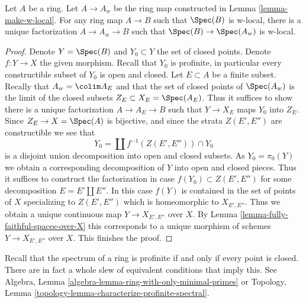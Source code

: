 \begin{lemma}
\label{lemma-universal}
Let $A$ be a ring. Let $A \to A_w$ be the ring map constructed in
Lemma \ref{lemma-make-w-local}. For any ring map $A \to B$ such that
$\Spec(B)$ is w-local, there is a unique factorization $A \to A_w \to B$
such that $\Spec(B) \to \Spec(A_w)$ is w-local.
\end{lemma}

\begin{proof}
Denote $Y = \Spec(B)$ and $Y_0 \subset Y$ the set of closed points.
Denote $f : Y \to X$ the given morphism.
Recall that $Y_0$ is profinite, in particular every constructible
subset of $Y_0$ is open and closed. Let $E \subset A$ be a finite subset.
Recally that $A_w = \colim A_E$ and that the set of closed points of
$\Spec(A_w)$ is the limit of the closed subsets $Z_E \subset X_E = \Spec(A_E)$.
Thus it suffices to show there is a unique factorization $A \to A_E \to B$
such that $Y \to X_E$ maps $Y_0$ into $Z_E$.
Since $Z_E \to X = \Spec(A)$ is bijective, and since the strata
$Z(E', E'')$ are constructible we see that
$$
Y_0 = \coprod f^{-1}(Z(E', E'')) \cap Y_0
$$
is a disjoint union decomposition into open and closed subsets.
As $Y_0 = \pi_0(Y)$ we obtain a corresponding decomposition of
$Y$ into open and closed pieces. Thus it suffices to construct
the factorization in case $f(Y_0) \subset Z(E', E'')$ for
some decomposition $E = E' \amalg E''$.
In this case $f(Y)$ is contained in the set of points of $X$
specializing to $Z(E', E'')$ which is homeomorphic to $X_{E', E''}$.
Thus we obtain a unique continuous map $Y \to X_{E', E''}$ over $X$. By
Lemma \ref{lemma-fully-faithful-spaces-over-X}
this corresponds to a unique morphism of schemes
$Y \to X_{E', E''}$ over $X$. This finishes the proof.
\end{proof}

\noindent
Recall that the spectrum of a ring is profinite if and only if
every point is closed. There are in fact a whole slew of equivalent
conditions that imply this. See
Algebra, Lemma \ref{algebra-lemma-ring-with-only-minimal-primes} or
Topology, Lemma \ref{topology-lemma-characterize-profinite-spectral}.

